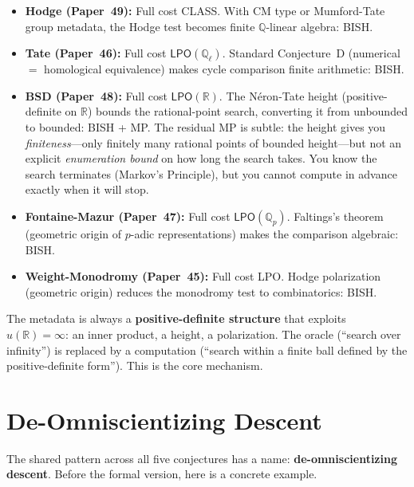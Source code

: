 \documentclass[11pt,twoside,openany]{report}
\theoremstyle{remark}
\newcommand{\BISH}{\textsf{BISH}}
\newcommand{\LPO}{\textsf{LPO}}
\newcommand{\CLASS}{\textsf{CLASS}}
\newcommand{\MP}{\textsf{MP}}
\newcommand{\paperref}[1]{\textbf{Paper~#1}}
\begin{document}
\begin{itemize}
  \item \textbf{Hodge (\paperref{49}):} Full cost \CLASS. With CM type or Mumford-Tate group metadata, the Hodge test becomes finite $\mathbb{Q}$-linear algebra: \BISH.
  \item \textbf{Tate (\paperref{46}):} Full cost $\LPO(\mathbb{Q}_\ell)$. Standard Conjecture~D (numerical $=$ homological equivalence) makes cycle comparison finite arithmetic: \BISH.
  \item \textbf{BSD (\paperref{48}):} Full cost $\LPO(\mathbb{R})$. The N\'eron-Tate height (positive-definite on $\mathbb{R}$) bounds the rational-point search, converting it from unbounded to bounded: \BISH{} + \MP. The residual \MP{} is subtle: the height gives you \emph{finiteness}---only finitely many rational points of bounded height---but not an explicit \emph{enumeration bound} on how long the search takes. You know the search terminates (Markov's Principle), but you cannot compute in advance exactly when it will stop.
  \item \textbf{Fontaine-Mazur (\paperref{47}):} Full cost $\LPO(\mathbb{Q}_p)$. Faltings's theorem (geometric origin of $p$-adic representations) makes the comparison algebraic: \BISH.
  \item \textbf{Weight-Monodromy (\paperref{45}):} Full cost \LPO. Hodge polarization (geometric origin) reduces the monodromy test to combinatorics: \BISH.
\end{itemize}

The metadata is always a \textbf{positive-definite structure} that exploits $u(\mathbb{R}) = \infty$: an inner product, a height, a polarization. The oracle (``search over infinity'') is replaced by a computation (``search within a finite ball defined by the positive-definite form''). This is the core mechanism.


\section{De-Omniscientizing Descent}

The shared pattern across all five conjectures has a name: \textbf{de-omniscientizing descent}. Before the formal version, here is a concrete example.
\end{document}
